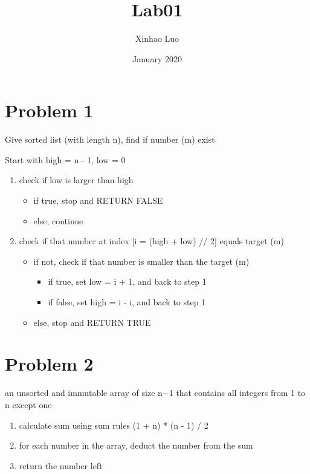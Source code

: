 \documentclass{article}
\title{Lab01}
\author{Xinhao Luo}
\date{January 2020}
\begin{document}
\maketitle

\section{Problem 1}

Give sorted list (with length n), find if number (m) exist

Start with high = n - 1, low = 0

\begin{enumerate}
    \item check if low is larger than high
        \begin{itemize}
            \item if true, stop and RETURN FALSE
            \item else, continue
        \end{itemize}
    \item check if that number at index [i = (high + low) // 2] equals target (m)
        \begin{itemize}
            \item if not, check if that number is smaller than the target (m)
                \begin{itemize}
                    \item if true, set low = i + 1, and back to step 1
                    \item if false, set high = i - i, and back to step 1
                \end{itemize}
            \item else, stop and RETURN TRUE
        \end{itemize}
\end{enumerate}


\section{Problem 2}

an unsorted and immutable array of size n−1 that contains all integers from 1 to n except one

\begin{enumerate}
    \item calculate sum using sum rules (1 + n) * (n - 1) / 2
    \item for each number in the array, deduct the number from the sum
    \item return the number left
\end{enumerate}
\end{document}
